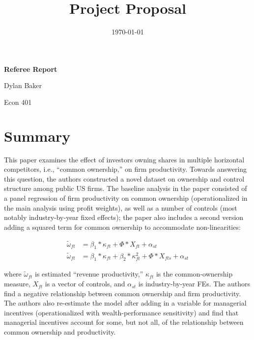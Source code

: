 \documentclass[12pt]{article}
\title{Project Proposal}
\begin{document}
\begin{titlepage}
    \pagestyle{empty} %
    \centering
    \vspace*{\fill}
    {\Huge\bfseries Referee Report\par}
    \vspace{1.5cm}
    {\Large Dylan Baker\par}
    \vspace{1.5cm}
    {\large Econ 401\par}
    \vfill
    \date{\today}
\end{titlepage}

\newpage 


\section{Summary}

This paper examines the effect of investors owning 
shares in multiple horizontal competitors, i.e., ``common ownership,''
on firm productivity. Towards answering this question, the authors constructed a novel
dataset on ownership and control structure
among public US firms. The baseline analysis in the paper consisted 
of a panel regression of firm productivity on common ownership 
(operationalized in the main analysis using profit weights), as well as 
a number of controls (most notably industry-by-year fixed effects); the paper 
also includes a second version adding a squared term for common ownership
to accommodate non-linearities:
\vspace{-1em}

\begin{align}
    \widetilde{\omega}_{f t}&=\beta_1 * \kappa_{f t}+\Phi * X_{f t}+\alpha_{s t} \\
    \widetilde{\omega}_{f t}&=\beta_1 * \kappa_{f t}+\beta_2 * \kappa_{f t}^2+\Phi * X_{f t s}+\alpha_{s t}
\end{align}
\vspace{-1em}

where $\widetilde{\omega}_{f t}$ is estimated ``revenue productivity,''
$\kappa_{f t}$ is the common-ownership measure, $X_{f t}$ is a vector of controls,
and $\alpha_{s t}$ is industry-by-year FEs.
The authors find a negative relationship between common ownership and firm productivity.
The authors also re-estimate the model after adding 
in a variable for managerial incentives (operationalized with 
wealth-performance sensitivity) and find that managerial incentives
account for some, but not all, of the relationship 
between common ownership and productivity.
\end{document}
